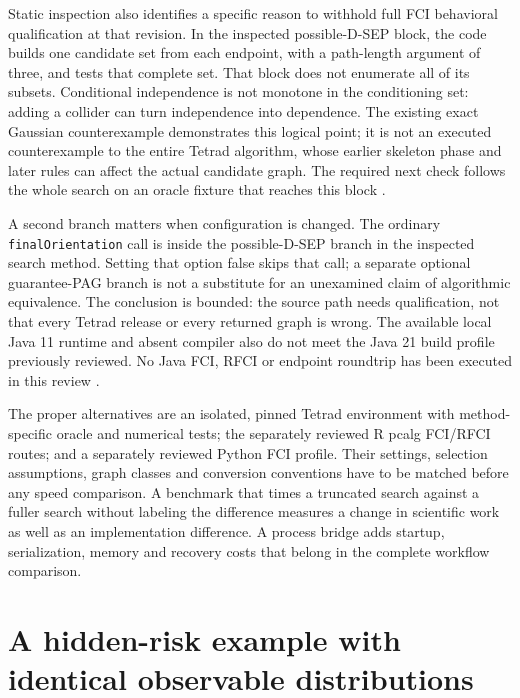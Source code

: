 Static inspection also identifies a specific reason to withhold full FCI
behavioral qualification at that revision. In the inspected possible-D-SEP
block, the code builds one candidate set from each endpoint, with a path-length
argument of three, and tests that complete set. That block does not enumerate
all of its subsets. Conditional independence is not monotone in the conditioning
set: adding a collider can turn independence into dependence. The existing
exact Gaussian counterexample demonstrates this logical point; it is not an
executed counterexample to the entire Tetrad algorithm, whose earlier skeleton
phase and later rules can affect the actual candidate graph. The required next
check follows the whole search on an oracle fixture that reaches this block
\citep{exec13_java_examples,exec14_java_latent_sources}.

A second branch matters when configuration is changed. The ordinary
\texttt{finalOrientation} call is inside the possible-D-SEP branch in the
inspected search method. Setting that option false skips that call; a separate
optional guarantee-PAG branch is not a substitute for an unexamined claim of
algorithmic equivalence. The conclusion is bounded: the source path needs
qualification, not that every Tetrad release or every returned graph is wrong.
The available local Java 11 runtime and absent compiler also do not meet the
Java 21 build profile previously reviewed. No Java FCI, RFCI or endpoint
roundtrip has been executed in this review
\citep{exec14_java_latent_sources,exec13_tetrad_reuse_primary}.

The proper alternatives are an isolated, pinned Tetrad environment with
method-specific oracle and numerical tests; the separately reviewed R pcalg
FCI/RFCI routes; and a separately reviewed Python FCI profile. Their settings,
selection assumptions, graph classes and conversion conventions have to be
matched before any speed comparison. A benchmark that times a truncated search
against a fuller search without labeling the difference measures a change in
scientific work as well as an implementation difference. A process bridge adds
startup, serialization, memory and recovery costs that belong in the complete
workflow comparison.

\section{A hidden-risk example with identical observable distributions}

